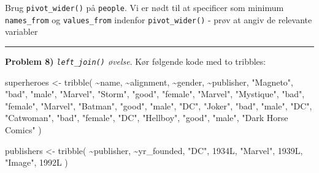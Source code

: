 \documentclass[
]{book}
\newenvironment{Shaded}{\begin{snugshade}}{\end{snugshade}}
\newcommand{\FunctionTok}[1]{\textcolor[rgb]{0.00,0.00,0.00}{#1}}
\newcommand{\NormalTok}[1]{#1}
\newcommand{\OtherTok}[1]{\textcolor[rgb]{0.56,0.35,0.01}{#1}}
\newcommand{\SpecialCharTok}[1]{\textcolor[rgb]{0.00,0.00,0.00}{#1}}
\newcommand{\StringTok}[1]{\textcolor[rgb]{0.31,0.60,0.02}{#1}}
\begin{document}
Brug \texttt{pivot\_wider()} på \texttt{people}. Vi er nødt til at specificer som minimum \texttt{names\_from} og \texttt{values\_from} indenfor \texttt{pivot\_wider()} - prøv at angiv de relevante variabler

\begin{center}\rule{0.5\linewidth}{0.5pt}\end{center}

\textbf{Problem 8)} \emph{\texttt{left\_join()} øvelse}. Kør følgende kode med to tribbles:

\begin{Shaded}
\begin{Highlighting}[]
\NormalTok{superheroes }\OtherTok{\textless{}{-}} \FunctionTok{tribble}\NormalTok{(}
       \SpecialCharTok{\textasciitilde{}}\NormalTok{name, }\SpecialCharTok{\textasciitilde{}}\NormalTok{alignment,  }\SpecialCharTok{\textasciitilde{}}\NormalTok{gender,          }\SpecialCharTok{\textasciitilde{}}\NormalTok{publisher,}
   \StringTok{"Magneto"}\NormalTok{,      }\StringTok{"bad"}\NormalTok{,   }\StringTok{"male"}\NormalTok{,            }\StringTok{"Marvel"}\NormalTok{,}
     \StringTok{"Storm"}\NormalTok{,     }\StringTok{"good"}\NormalTok{, }\StringTok{"female"}\NormalTok{,            }\StringTok{"Marvel"}\NormalTok{,}
  \StringTok{"Mystique"}\NormalTok{,      }\StringTok{"bad"}\NormalTok{, }\StringTok{"female"}\NormalTok{,            }\StringTok{"Marvel"}\NormalTok{,}
    \StringTok{"Batman"}\NormalTok{,     }\StringTok{"good"}\NormalTok{,   }\StringTok{"male"}\NormalTok{,                }\StringTok{"DC"}\NormalTok{,}
     \StringTok{"Joker"}\NormalTok{,      }\StringTok{"bad"}\NormalTok{,   }\StringTok{"male"}\NormalTok{,                }\StringTok{"DC"}\NormalTok{,}
  \StringTok{"Catwoman"}\NormalTok{,      }\StringTok{"bad"}\NormalTok{, }\StringTok{"female"}\NormalTok{,                }\StringTok{"DC"}\NormalTok{,}
   \StringTok{"Hellboy"}\NormalTok{,     }\StringTok{"good"}\NormalTok{,   }\StringTok{"male"}\NormalTok{, }\StringTok{"Dark Horse Comics"}
\NormalTok{  )}

\NormalTok{publishers }\OtherTok{\textless{}{-}} \FunctionTok{tribble}\NormalTok{(}
  \SpecialCharTok{\textasciitilde{}}\NormalTok{publisher, }\SpecialCharTok{\textasciitilde{}}\NormalTok{yr\_founded,}
        \StringTok{"DC"}\NormalTok{,       1934L,}
    \StringTok{"Marvel"}\NormalTok{,       1939L,}
     \StringTok{"Image"}\NormalTok{,       1992L}
\NormalTok{  )}
\end{Highlighting}
\end{Shaded}
\end{document}
